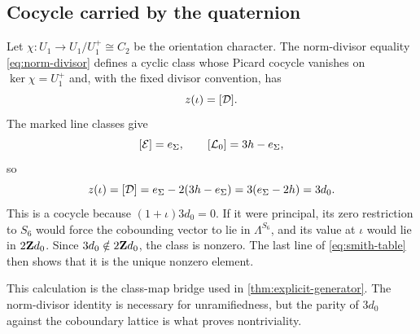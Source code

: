\subsection{Cocycle carried by the quaternion}

Let \(\chi:U_1\to U_1/U_1^+\cong C_2\) be the orientation character.  The
norm-divisor equality \cref{eq:norm-divisor} defines a cyclic class whose
Picard cocycle vanishes on \(\ker\chi=U_1^+\) and, with the fixed divisor
convention, has
\[
 z(\iota)=[\mathcal D].
\]
The marked line classes give
\[
 [\mathcal E]=e_\Sigma,\qquad [\mathcal L_0]=3h-e_\Sigma,
\]
so
\[
 z(\iota)=[\mathcal D]
 =e_\Sigma-2(3h-e_\Sigma)
 =3(e_\Sigma-2h)=3d_0.
\]
This is a cocycle because \((1+\iota)3d_0=0\).  If it were principal, its
zero restriction to \(S_6\) would force the cobounding vector to lie in
\(\Lambda^{S_6}\), and its value at \(\iota\) would lie in
\(2\mathbf Z d_0\).  Since \(3d_0\notin2\mathbf Z d_0\), the class is nonzero.  The last
line of \cref{eq:smith-table} then shows that it is the unique nonzero
element.

This calculation is the class-map bridge used in
\cref{thm:explicit-generator}.  The norm-divisor identity is necessary for
unramifiedness, but the parity of \(3d_0\) against the coboundary lattice is
what proves nontriviality.
